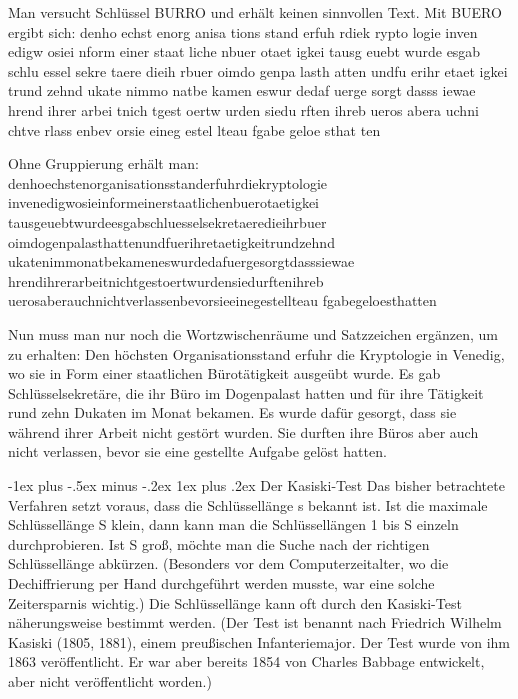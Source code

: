 \documentclass[a4paper]{article}
\makeatletter
\renewcommand{\subsubsection}{\@startsection{subsubsection}{3}{0mm}%
 {-1ex plus -.5ex minus -.2ex}%
 {1ex plus .2ex}%
 {\normalfont\small\bfseries}}
\makeatother
\begin{document}
\begin{multicols}{3}
    Man versucht Schlüssel BURRO und erhält keinen sinnvollen Text. Mit BUERO ergibt sich:
    denho echst enorg anisa tions stand erfuh rdiek rypto logie
    inven edigw osiei nform einer staat liche nbuer otaet igkei
    tausg euebt wurde esgab schlu essel sekre taere dieih rbuer
    oimdo genpa lasth atten undfu erihr etaet igkei trund zehnd
    ukate nimmo natbe kamen eswur dedaf uerge sorgt dasss iewae
    hrend ihrer arbei tnich tgest oertw urden siedu rften ihreb
    ueros abera uchni chtve rlass enbev orsie eineg estel lteau
    fgabe geloe sthat ten

    Ohne Gruppierung erhält man:
    denhoechstenorganisationsstanderfuhrdiekryptologie
    invenedigwosieinformeinerstaatlichenbuerotaetigkei
    tausgeuebtwurdeesgabschluesselsekretaeredieihrbuer
    oimdogenpalasthattenundfuerihretaetigkeitrundzehnd
    ukatenimmonatbekameneswurdedafuergesorgtdasssiewae
    hrendihrerarbeitnichtgestoertwurdensiedurftenihreb
    uerosaberauchnichtverlassenbevorsieeinegestellteau
    fgabegeloesthatten

    Nun muss man nur noch die Wortzwischenräume und Satzzeichen ergänzen, um zu erhalten:
    Den höchsten Organisationsstand erfuhr die Kryptologie in Venedig, wo sie in Form einer staatlichen Bürotätigkeit ausgeübt wurde. Es gab Schlüsselsekretäre, die ihr Büro im Dogenpalast hatten und für ihre Tätigkeit rund zehn Dukaten im Monat bekamen. Es wurde dafür gesorgt, dass sie während ihrer Arbeit nicht gestört wurden. Sie durften ihre Büros aber auch nicht verlassen, bevor sie eine gestellte Aufgabe gelöst hatten.

    \subsubsection{Der Kasiski-Test}
    Das bisher betrachtete Verfahren setzt voraus, dass die Schlüssellänge s bekannt ist. Ist die maximale Schlüssellänge S klein, dann kann man die Schlüssellängen 1 bis S einzeln durchprobieren. Ist S groß, möchte man die Suche nach der richtigen Schlüssellänge abkürzen. (Besonders vor dem Computerzeitalter, wo die Dechiffrierung per Hand durchgeführt werden musste, war eine solche Zeitersparnis wichtig.) Die Schlüssellänge kann oft durch den Kasiski-Test näherungsweise bestimmt werden. (Der Test ist benannt nach Friedrich Wilhelm Kasiski (1805, 1881), einem preußischen Infanteriemajor. Der Test wurde von ihm 1863 veröffentlicht. Er war aber bereits 1854 von Charles Babbage entwickelt, aber nicht veröffentlicht worden.)


\end{multicols}
\end{document}
